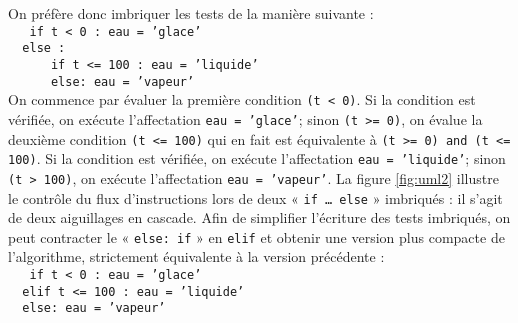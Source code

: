 On préfère donc imbriquer les tests de la manière suivante :\\
{\footnotesize\tt
\mbox{}\ \ if t < 0 : eau = 'glace'\\
\mbox{}\ \ else :\\
\mbox{}\ \ \ \ \ \ if t <= 100 : eau = 'liquide'\\
\mbox{}\ \ \ \ \ \ else: eau = 'vapeur'
}\\
On commence par évaluer la première condition {\tt (t < 0)}. Si la condition est vérifiée,
on exécute l'affectation {\tt eau = 'glace'}; sinon {\tt (t >= 0)}, on évalue la deuxième 
condition {\tt (t <= 100)} qui en fait est équivalente à {\tt (t >= 0) and (t <= 100)}. 
Si la condition est vérifiée, on exécute l'affectation {\tt eau = 'liquide'};
sinon {\tt (t > 100)}, on exécute l'affectation {\tt eau = 'vapeur'}.
La figure \ref{fig:uml2} illustre le contrôle du flux d'instructions lors de deux
« {\tt if \ldots\ else} » imbriqués : il s'agit de deux aiguillages en cascade.
Afin de simplifier l'écriture des tests imbriqués, on peut contracter le « {\tt else: if} »
en {\tt elif} et obtenir une version plus compacte de l'algorithme, 
strictement équivalente à la version précédente :\\
{\footnotesize\tt
\mbox{}\ \ if t < 0 : eau = 'glace'\\
\mbox{}\ \ elif t <= 100 : eau = 'liquide'\\
\mbox{}\ \ else: eau = 'vapeur'\\
}

